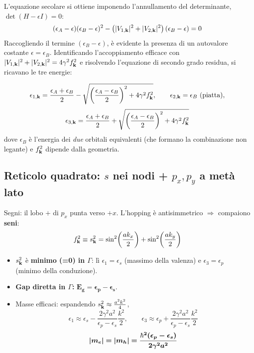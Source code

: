 L'equazione secolare si ottiene imponendo l'annullamento del determinante, $\det(H - \epsilon I) = 0$:
\[ 
(\epsilon_A - \epsilon)(\epsilon_B - \epsilon)^2 - \left(|V_{1,\mathbf{k}}|^2 + |V_{2,\mathbf{k}}|^2\right)(\epsilon_B - \epsilon) = 0 
\]
Raccogliendo il termine $(\epsilon_B - \epsilon)$, è evidente la presenza di un autovalore costante $\epsilon = \epsilon_B$. Identificando l'accoppiamento efficace con $|V_{1,\mathbf{k}}|^2 + |V_{2,\mathbf{k}}|^2 = 4\gamma^2 f_{\mathbf{k}}^2$ e risolvendo l'equazione di secondo grado residua, si ricavano le tre energie:

\[ \epsilon_{1,\mathbf{k}} = \frac{\epsilon_A+\epsilon_B}{2}-\sqrt{\left(\frac{\epsilon_A-\epsilon_B}{2}\right)^2+4\gamma^2 f_{\mathbf{k}}^2},
   \qquad \epsilon_{2,\mathbf{k}}=\epsilon_B\ (\text{piatta}), \]
\[ \epsilon_{3,\mathbf{k}} = \frac{\epsilon_A+\epsilon_B}{2}+\sqrt{\left(\frac{\epsilon_A-\epsilon_B}{2}\right)^2+4\gamma^2 f_{\mathbf{k}}^2} \]
dove $\epsilon_B$ è l'energia dei \emph{due} orbitali equivalenti (che formano la combinazione non legante) e $f_{\mathbf{k}}^2$ dipende dalla geometria.

\subsection{Reticolo quadrato: $s$ nei nodi + $p_x, p_y$ a metà lato}
Segni: il lobo $+$ di $p_x$ punta verso $+x$. L'hopping è antisimmetrico $\Rightarrow$ compaiono \textbf{seni}:
\[ f_{\mathbf{k}}^2 \equiv s_{\mathbf{k}}^2 = \sin^2\!\left(\frac{ak_x}{2}\right)+\sin^2\!\left(\frac{ak_y}{2}\right) \]
\begin{itemize}
  \item $s_{\mathbf{k}}^2$ è \textbf{minimo (=0) in $\Gamma$}: lì $\epsilon_1 = \epsilon_s$ (massimo della valenza) e $\epsilon_3 = \epsilon_p$ (minimo della conduzione).
  \item \textbf{Gap diretta in $\Gamma$:} $\bm{E_g = \epsilon_p-\epsilon_s}$.
  \item Masse efficaci: espandendo $s^2_{\mathbf{k}}\approx \frac{a^2k^2}{4}$,
  \[ \epsilon_{1}\approx\epsilon_s - \frac{2\gamma^2a^2}{\epsilon_p-\epsilon_s}\frac{k^2}{2}, \qquad
     \epsilon_{3}\approx\epsilon_p + \frac{2\gamma^2a^2}{\epsilon_p-\epsilon_s}\frac{k^2}{2} \]
  \[ \bm{|m_e| = |m_h| = \frac{\hbar^2(\epsilon_p-\epsilon_s)}{2\gamma^2a^2}} \]
\end{itemize}

